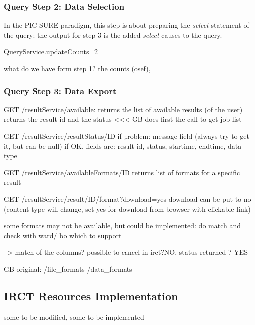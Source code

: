 \subsubsection{Query Step 2:  Data Selection}

In the PIC-SURE paradigm, this step is about preparing the \emph{select} statement of the query: the output for step 3 is the added \emph{select} causes to the query.



QueryService.updateCounts_2


what do we have form step 1? the counts (osef), 



\subsubsection{Query Step 3:  Data Export}







GET /resultService/available: returns the list of available results (of the user)
returns the result id and the status
<<< GB does first the call to get job list

GET /resultService/resultStatus/ID
if problem: message field (always try to get it, but can be null)
if OK, fields are: result id, status, startime, endtime, data type

GET /resultService/availableFormats/ID
returns list of formats for a specific result

GET /resultService/result/ID/format?download=yes
download can be put to no (content type will change, set yes for download from browser with clickable link)


some formats may not be available, but could be implemented: do match and check with ward/ bo which to support

--> match of the columns? possible to cancel in irct?NO, status returned ? YES

GB original: 
/file\_formats
/data\_formats


\subsection{IRCT Resources Implementation}
some to be modified, some to be implemented

